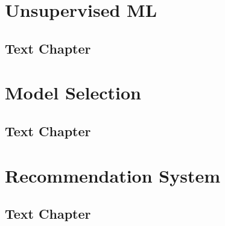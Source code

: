 \documentclass[11pt,fleqn]{book} %
\begin{document}


\part{Unsupervised ML}



\chapter{Text Chapter}



\part{Model Selection}



\chapter{Text Chapter}



\part{Recommendation System}



\chapter{Text Chapter}
\end{document}
